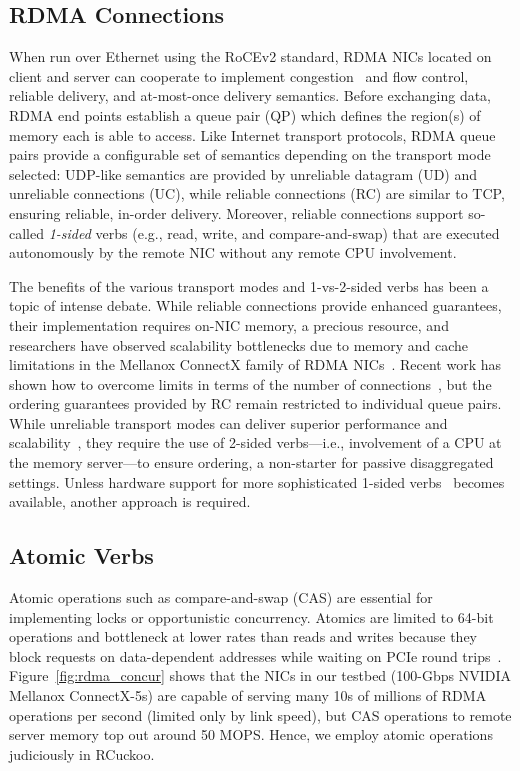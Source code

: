 \documentclass[12pt]{ucsddissertation}
\begin{document}
\subsection{RDMA Connections}

When run over Ethernet using the RoCEv2
standard, RDMA NICs located on client and server can cooperate to
implement congestion~\cite{hpcc,dcqcn} and flow control, reliable
delivery, and at-most-once delivery semantics.  Before exchanging
data, RDMA end points establish a queue pair (QP) which defines the
region(s) of memory each is able to access.  Like Internet transport
protocols, RDMA queue pairs provide a configurable set of semantics
depending on the transport mode selected: UDP-like semantics are
provided by unreliable datagram (UD) and unreliable connections (UC),
while reliable connections (RC) are similar to TCP, ensuring reliable,
in-order delivery.  Moreover, reliable connections support so-called
\emph{1-sided} verbs (e.g., read, write, and compare-and-swap) that
are executed autonomously by the remote NIC without any remote CPU
involvement.

The benefits of the various transport modes and
1-vs-2-sided verbs has been a topic of intense debate.  While reliable
connections provide enhanced guarantees, their implementation requires
on-NIC memory, a precious resource, and researchers have observed
scalability bottlenecks due to memory and cache limitations in the
Mellanox ConnectX family of RDMA
NICs~\cite{farm,fasst,erpc,lite,design-guidelines}.  Recent work has
shown how to overcome limits in terms of the number of
connections~\cite{storm,flock}, but the ordering guarantees provided
by RC remain restricted to individual queue pairs.  While unreliable
transport modes can deliver superior performance and
scalability~\cite{fasst}, they require the use of 2-sided
verbs---i.e., involvement of a CPU at the memory server---to ensure
ordering, a non-starter for passive disaggregated settings.  Unless
hardware support for more sophisticated 1-sided verbs~\cite{filemr,rma,star}
becomes available, another approach is required.


\subsection{Atomic Verbs}

Atomic operations such as compare-and-swap (CAS) are essential for
implementing locks or opportunistic concurrency. Atomics are limited
to 64-bit operations and bottleneck at lower rates than reads and
writes because they block requests on data-dependent addresses while
waiting on PCIe round trips~\cite{design-guidelines,sherman}.
Figure~\ref{fig:rdma_concur} shows that the NICs in our testbed
(100-Gbps NVIDIA Mellanox ConnectX-5s) are capable of serving many 10s of
millions of RDMA operations per second (limited only by link speed),
but CAS operations to remote server memory top out around 50 MOPS.  Hence, we employ atomic operations judiciously in RCuckoo.
\end{document}
